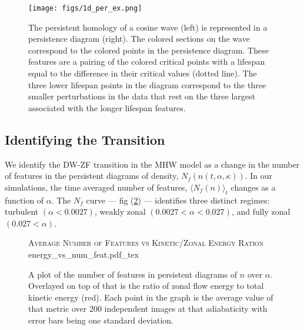 \documentclass[pdflatex,sn-aps]{sn-jnl}%
\newcommand{\incfig}[1]{%
    \def\svgwidth{\columnwidth}
    {#1.pdf_tex}
}
\theoremstyle{thmstyleone}%
\theoremstyle{thmstyletwo}%
\theoremstyle{thmstylethree}%
\begin{document}
    \begin{figure}[h]
        \centering
        \texttt{[image: figs/1d\_per\_ex.png]}%
        \caption[Example Persistence Diagram in One Dimension]{The persistent homology of a cosine wave (left) is represented in a persistence diagram (right).  The colored sections on the wave correspond to the colored points in the persistence diagram.  These features are a pairing of the colored critical points with a lifespan equal to the difference in their critical values (dotted line).  The three lower lifespan points in the diagram correspond to the three smaller perturbations in the data that rest on the three largest associated with the longer lifespan features. }%
        \label{fig:1d_per_ex}
    \end{figure}

\subsection{Identifying the Transition}\label{res:transition}

    \par
    We identify the DW-ZF transition in the MHW model as a change in the number of features in the persistent diagrams of density, $N_f(n(t,\alpha,\kappa))$.  In our simulations, the time averaged number of features, $\langle N_f(n) \rangle_t$ changes as a function of $\alpha$.  The $N_f$ curve --- fig (\ref{fig:number_of_features}) --- identifies three distinct regimes: turbulent $(\alpha < 0.0027)$, weakly zonal $( 0.0027 < \alpha < 0.027)$, and fully zonal $(0.027<\alpha)$.  
    \begin{figure}[h]
        \centering
        \textsc{Average Number of Features vs Kinetic/Zonal Energy Ration}
        \incfig{energy_vs_num_feat}
        \caption{A plot of the number of features in persistent diagrams of $n$ over $\alpha$.  Overlayed on top of that is the ratio of zonal flow energy to total kinetic energy (red).  Each point in the graph is the average value of that metric over 200 independent images at that adiabaticity with error bars being one standard deviation.}\label{fig:number_of_features}
    \end{figure}
\end{document}

